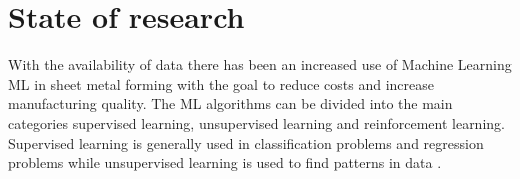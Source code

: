 

\section{State of research}

With the availability of data there has been an increased use of Machine Learning \ac{ML} in sheet metal forming with the goal to reduce costs and increase manufacturing quality.
\cite{bock_reviewapplicationmachine_2019} \cite[]{cao_manufacturingadvancedsmart_2019} %
The ML algorithms can be divided into the main categories supervised learning, unsupervised learning and reinforcement learning. \cite[]{liu_reinforcementlearningfreeform_2020}
Supervised learning is generally used in classification problems and regression problems while unsupervised learning is used to find patterns in data \cite[p. 2]{cruz_applicationmachinelearning_2021}.

